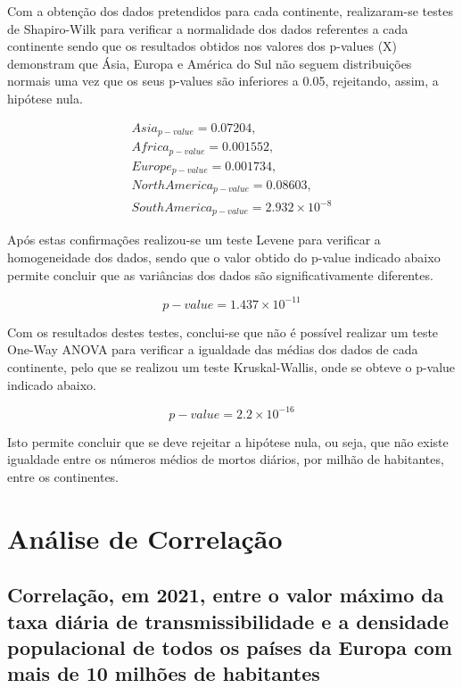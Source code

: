 \documentclass[conference]{IEEEtran}
\begin{document}
Com a obtenção dos dados pretendidos para cada continente, realizaram-se testes de Shapiro-Wilk para verificar a normalidade dos dados referentes a cada continente sendo que os resultados obtidos nos valores dos p-values (X) demonstram que Ásia, Europa e América do Sul não seguem distribuições normais uma vez que os seus p-values são inferiores a 0.05, rejeitando, assim, a hipótese nula.

\begin{equation}
	\begin{array}{l}
	Asia_{p-value}=0.07204, \\
	Africa_{p-value}=0.001552, \\
	Europe_{p-value}=0.001734, \\
	North America_{p-value}=0.08603, \\
	South America_{p-value}=2.932\times 10^{-8}
	\end{array}
\end{equation}

Após estas confirmações realizou-se um teste Levene para verificar a homogeneidade dos dados, sendo que o valor obtido do p-value indicado abaixo permite concluir que as variâncias dos dados são significativamente diferentes.

\begin{equation}
p-value = 1.437\times 10^{-11}\label{eq}
\end{equation}

Com os resultados destes testes, conclui-se que não é possível realizar um teste One-Way ANOVA para verificar a igualdade das médias dos dados de cada continente, pelo que se realizou um teste Kruskal-Wallis, onde se obteve o p-value indicado abaixo. 

\begin{equation}
p-value = 2.2\times 10^{-16}\label{eq}
\end{equation}

Isto permite concluir que se deve rejeitar a hipótese nula, ou seja, que não existe igualdade entre os números médios de mortos diários, por milhão de habitantes, entre os continentes.


\section{Análise de Correlação} %

\subsection{Correlação, em 2021, entre o valor máximo da taxa diária de transmissibilidade e a densidade populacional de todos os países da Europa com mais de 10 milhões de habitantes}
\end{document}
